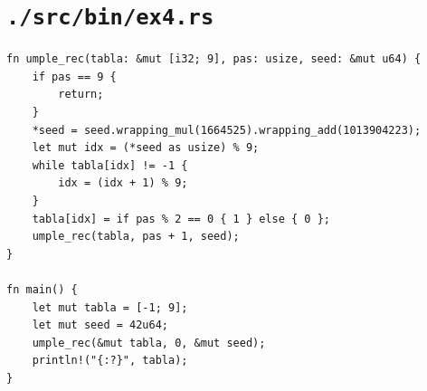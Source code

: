 \documentclass[11pt]{article}
\begin{document}
\section{\texttt{./src/bin/ex4.rs}}
\label{sec:orgca51c9b}
\begin{verbatim}
fn umple_rec(tabla: &mut [i32; 9], pas: usize, seed: &mut u64) {
    if pas == 9 {
        return;
    }
    *seed = seed.wrapping_mul(1664525).wrapping_add(1013904223);
    let mut idx = (*seed as usize) % 9;
    while tabla[idx] != -1 {
        idx = (idx + 1) % 9;
    }
    tabla[idx] = if pas % 2 == 0 { 1 } else { 0 };
    umple_rec(tabla, pas + 1, seed);
}

fn main() {
    let mut tabla = [-1; 9];
    let mut seed = 42u64;
    umple_rec(&mut tabla, 0, &mut seed);
    println!("{:?}", tabla);
}
\end{verbatim}
\end{document}
